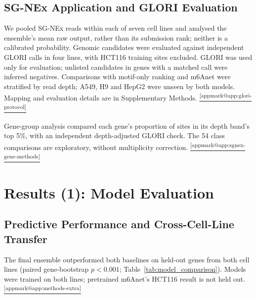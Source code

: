 \documentclass[11pt,a4paper]{article}
\makeatletter
\DeclareRobustCommand{\applink}[1]{%
    \hyperref[#1]{\textsuperscript{\ref*{appmark@#1}}}}
\makeatother
\begin{document}
\subsection{SG-NEx Application and GLORI Evaluation}
\label{sec:t2methods}
We pooled SG-NEx reads within each of seven cell lines and analysed the
ensemble's mean raw output, rather than its submission rank; neither is a
calibrated probability. Genomic candidates were evaluated against independent
GLORI calls in four lines, with HCT116 training sites excluded. GLORI was
used only for evaluation; unlisted candidates in genes with a matched call
were inferred negatives. Comparisons with motif-only ranking and m6Anet
were stratified by read depth; A549, H9 and HepG2 were unseen by both models.
Mapping and evaluation details are in Supplementary Methods.
\applink{app:glori-protocol}

Gene-group analysis compared each gene's proportion of sites in its depth
band's top 5\%, with an independent depth-adjusted GLORI check. The 54
class comparisons are exploratory, without multiplicity correction.
\applink{app:sgnex-gene-methods}

\section{Results (1): Model Evaluation}
\label{sec:results1}
\subsection{Predictive Performance and Cross-Cell-Line Transfer}
\label{sec:perf}
The final ensemble outperformed both baselines on held-out genes from
both cell lines (paired gene-bootstrap $p<0.001$;
Table~\ref{tab:model_comparison}). Models were trained on both lines;
pretrained m6Anet's HCT116 result is not held out.
\applink{app:methods-extra}
\end{document}
